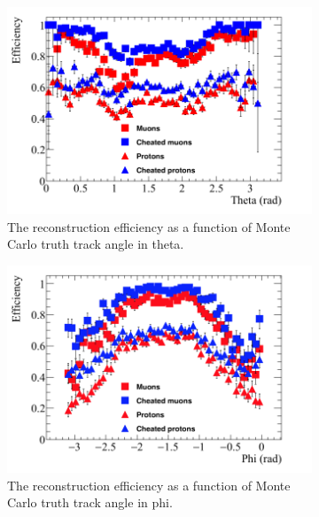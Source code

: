\begin{figure}[h!]
\begin{subfigure}{0.48\textwidth}
        \centering
        \includegraphics[width=\textwidth]{Effic_SingSamps_Theta}
        \caption{The reconstruction efficiency as a function of Monte Carlo truth track angle in theta.}
        \label{fig:Isol_Effic_Theta}
  \end{subfigure}%
  \hspace{0.03\textwidth}%
  \begin{subfigure}{0.48\textwidth}
        \centering
        \includegraphics[width=\textwidth]{Effic_SingSamps_Phi}
        \caption{The reconstruction efficiency as a function of Monte Carlo truth track angle in phi.}
        \label{fig:Isol_Effic_Phi}
  \end{subfigure}
  \begin{subfigure}{0.8\textwidth}
        \centering

\end{subfigure}
\end{figure}
